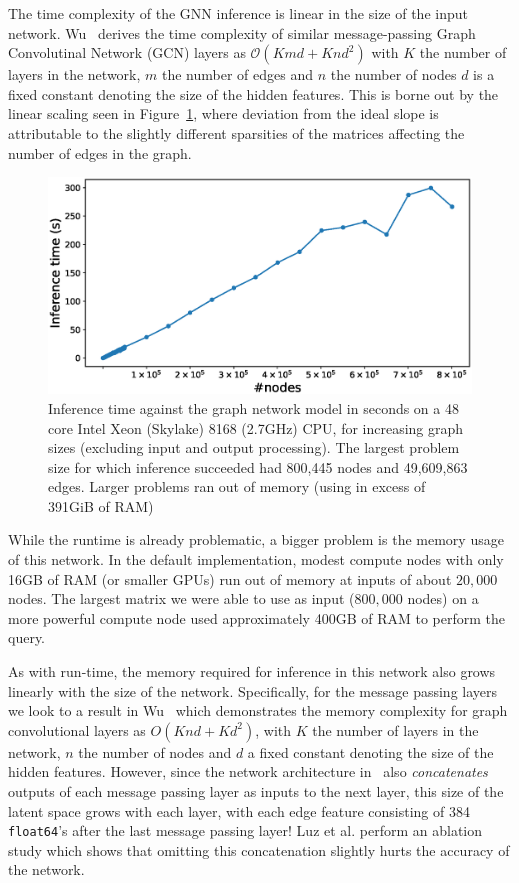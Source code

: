 \documentclass{svproc}
\newcommand{\etal}{et al. }
\begin{document}
The time complexity of the GNN inference is linear in the size of the input network. Wu~\cite{wu2020comprehensive} derives the time complexity of similar message-passing Graph Convolutinal Network (GCN) layers as $\mathcal{O}(Kmd + Knd^2)$ with $K$ the number of layers in the network, $m$ the number of edges and $n$ the number of nodes $d$ is a fixed constant denoting the size of the hidden features. This is borne out by the linear scaling seen in Figure~\ref{fig:small-runtime-inference}, where deviation from the ideal slope is attributable to the slightly different sparsities of the matrices affecting the number of edges in the graph.

\begin{figure}
    \centering
    \includegraphics[width=\linewidth]{images/gnn-inference-time.eps}
    \caption{Inference time against the graph network model in seconds on a 48 core Intel Xeon (Skylake) 8168 (2.7GHz) CPU, for increasing graph sizes (excluding input and output processing). The largest problem size for which inference succeeded had 800,445 nodes and 49,609,863 edges. Larger problems ran out of memory (using in excess of 391GiB of RAM)}
    \label{fig:small-runtime-inference}
\end{figure}

While the runtime is already problematic, a bigger problem is the memory usage of this network. In the default implementation, modest compute nodes with only 16GB of RAM (or smaller GPUs) run out of memory at inputs of about $20,000$ nodes. The largest matrix we were able to use as input ($800,000$ nodes) on a more powerful compute node used approximately 400GB of RAM to perform the query.

As with run-time, the memory required for inference in this network also grows linearly with the size of the network. Specifically, for the message passing layers we look to a result in Wu~\cite{wu2020comprehensive}  which demonstrates the memory complexity for graph convolutional layers as $O(Knd + Kd^2)$, with $K$ the number of layers in the network, $n$ the number of nodes and $d$ a fixed constant denoting the size of the hidden features. However, since the network architecture in~\cite{Luz2020} also \textit{concatenates} outputs of each message passing layer as inputs to the next layer, this size of the latent space grows with each layer, with each edge feature consisting of 384 \texttt{float64}'s after the last message passing layer! Luz \etal perform an ablation study which shows that omitting this concatenation slightly hurts the accuracy of the network. 
\end{document}
